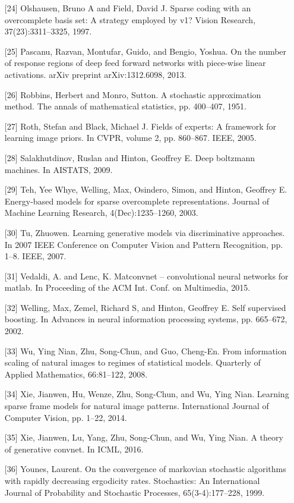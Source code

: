 \begin{itemize}
\item [{[}24{]}] Olshausen, Bruno A and Field, David J. Sparse coding with an overcomplete basis set: A strategy employed by v1? Vision Research, 37(23):3311–3325, 1997.
\item [{[}25{]}] Pascanu, Razvan, Montufar, Guido, and Bengio, Yoshua. On the number of response regions of deep feed forward networks with piece-wise linear activations. arXiv preprint arXiv:1312.6098, 2013.
\item [{[}26{]}] Robbins, Herbert and Monro, Sutton. A stochastic approximation method. The annals of mathematical statistics, pp. 400–407, 1951.
\item [{[}27{]}] Roth, Stefan and Black, Michael J. Fields of experts: A framework for learning image priors. In CVPR, volume 2, pp. 860–867. IEEE, 2005.
\item [{[}28{]}] Salakhutdinov, Ruslan and Hinton, Geoffrey E. Deep boltzmann machines. In AISTATS, 2009.
\item [{[}29{]}] Teh, Yee Whye, Welling, Max, Osindero, Simon, and Hinton, Geoffrey E. Energy-based models for sparse overcomplete representations. Journal of Machine Learning Research, 4(Dec):1235–1260, 2003.
\item [{[}30{]}] Tu, Zhuowen. Learning generative models via discriminative approaches. In 2007 IEEE Conference on Computer Vision and Pattern Recognition, pp. 1–8. IEEE, 2007.
\item [{[}31{]}] Vedaldi, A. and Lenc, K. Matconvnet – convolutional neural networks for matlab. In Proceeding of the ACM Int. Conf. on Multimedia, 2015.
\item [{[}32{]}] Welling, Max, Zemel, Richard S, and Hinton, Geoffrey E. Self supervised boosting. In Advances in neural information processing systems, pp. 665–672, 2002.
\item [{[}33{]}] Wu, Ying Nian, Zhu, Song-Chun, and Guo, Cheng-En. From information scaling of natural images to regimes of statistical models. Quarterly of Applied Mathematics, 66:81–122, 2008.
\item [{[}34{]}] Xie, Jianwen, Hu, Wenze, Zhu, Song-Chun, and Wu, Ying Nian. Learning sparse frame models for natural image patterns. International Journal of Computer Vision, pp. 1–22, 2014.
\item [{[}35{]}] Xie, Jianwen, Lu, Yang, Zhu, Song-Chun, and Wu, Ying Nian. A theory of generative convnet. In ICML, 2016.
\item [{[}36{]}] Younes, Laurent. On the convergence of markovian stochastic algorithms with rapidly decreasing ergodicity rates. Stochastics: An International Journal of Probability and Stochastic Processes, 65(3-4):177–228, 1999.

\end{itemize}
